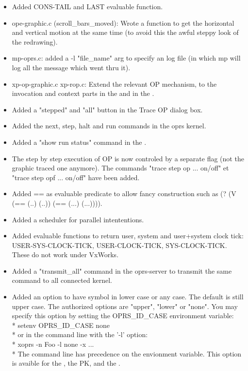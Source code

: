 \begin{itemize}

\item Added CONS-TAIL and LAST evaluable function.

\item ope-graphic.c (scroll\_bars\_moved): Wrote a function to get the
horizontal and vertical motion at the same time (to avoid this
the awful steppy look of the redrawing).

\item mp-oprs.c: added a -l "file\_name" arg to specify an log file
(in which mp will log all the message which went thru it).

\item xp-op-graphic.c xp-rop.c: Extend the relevant OP mechanism, to
the invocation and context parts in the \XPK{} and in the \OPE{}.

\item Added a "stepped" and "all" button in the Trace OP dialog box.

\item Added the next, step, halt and run commands in the oprs kernel.

\item Added a "show run status" command in the \CPK{}.

\item The step by step execution of OP is now controled by a separate
flag (not the graphic traced one anymore). The commands "trace
step op ... on/off" et "trace step opf ... on/off" have been
added.

\item Added == as evaluable predicate to allow fancy construction such
as (? (V (== (..) (..)) (== (...) (...)))).

\item Added a scheduler for parallel intententions.

\item Added evaluable functions to return
user, system and user+system clock tick:
USER-SYS-CLOCK-TICK, USER-CLOCK-TICK, SYS-CLOCK-TICK.
These do not work under VxWorks.
 
\item Added a "transmit\_all" command in the oprs-server to transmit the same
command to all connected kernel. 

\item Added an option to have symbol in lower case or any case.
The default is still upper case.
The authorized options are "upper", "lower" or "none".  
You may specify this option by setting the OPRS\_ID\_CASE
environment variable:\\*
     setenv OPRS\_ID\_CASE none \\*
or in the command line with the '-l' option:\\*
     xoprs -n Foo -l none -x ...\\*
The command line has precedence on the envionment variable.
This option is avaible for the \OPRSS{}, the PK{}, and the \OPE{}.


\end{itemize}
